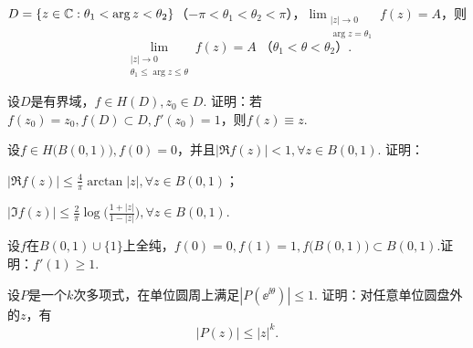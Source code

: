 \begin{xiti}
\begin{enuma}
      \item $D=\{z\in \mathbb C:\theta_1<\arg z<\theta_2\}$（$-\pi<\theta_1<\theta_2<\pi$），$\lim_{\substack{|z|\to0\\
      \arg z=\theta_1}}f(z)=A$，则
      \[\lim_{\substack{|z|\to0\\\theta_1\le\arg z\le\theta}}f(z)=A\;\mbox{（$\theta_1<\theta<\theta_2$）}.\]
    \end{enuma}
  \item 设$D$是有界域，$f\in H(D),z_0\in D$. 证明：若$f(z_0)=z_0,f(D)\subset D,f'(z_0)=1$，则$f(z)\equiv z$.
  \item 设$f\in H\big(B(0,1)\big),f(0)=0$，并且$|\Re f(z)|<1,\forall z\in B(0,1)$. 证明：
    \begin{enuma}
      \item $|\Re f(z)|\le\frac4\pi\arctan|z|,\forall z\in B(0,1)$；
      \item $|\Im f(z)|\le\frac2\pi\log\bigg(\frac{1+|z|}{1-|z|}\bigg),\forall z\in B(0,1)$.
    \end{enuma}
  \item 设$f$在$B(0,1)\cup\{1\}$上全纯，$f(0)=0,f(1)=1,f\big(B(0,1)\big)\subset B(0,1)$.证明：$f'(1)\ge1$.
  \item 设$P$是一个$k$次多项式，在单位圆周上满足$|P(\ee^{\ii\theta})|\le1$. 证明：对任意单位圆盘外的$z$，有
      \[
        |P(z)|\le |z|^k.
      \]
\end{xiti}
